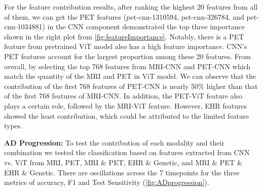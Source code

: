 For the feature contribution results, after ranking the highest 20 features from all of them, we can get the PET features (pet-cnn-1310594, pet-cnn-326784, and pet-cnn-1034881) in the CNN component demonstrated the top three importance shown in the right plot from \autoref{fig:featureImportance}. Notably, there is a PET feature from pretrained ViT model also has a high feature importance. CNN’s PET features account for the largest proportion among these 20 features. From overall, by selecting the top 768 features from MRI-CNN and PET-CNN which match the quantity of the MRI and PET in ViT model. We can observe that the contribution of the first 768 features of PET-CNN is nearly 50\% higher than that of the first 768 features of MRI-CNN. In addition, the PET-ViT feature also plays a certain role, followed by the MRI-ViT feature. However, EHR features showed the least contribution, which could be attributed to the limited feature types. 
 
\textbf{AD Progression: } To test the contribution of each modality and their combination we tested the classification based on features extracted from CNN vs. ViT from MRI, PET, MRI \& PET, EHR \& Genetic, and MRI \& PET \& EHR \& Genetic. There are oscillations across the 7 timepoints for the three metrics of accuracy, F1 and Test Sensitivity (\autoref{fig:ADprogression}).  

